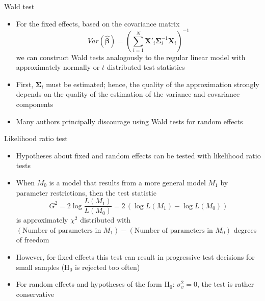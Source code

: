 \documentclass[aspectratio=169]{beamer}
\newcommand{\mat}[1]{\mathbf{#1}}
\newcommand{\gvect}[1]{\boldsymbol{#1}}
\newcommand{\gmat}[1]{\boldsymbol{#1}}
\begin{document}
\begin{frame}{Wald test}
  \begin{itemize}
    \item For the fixed effects, based on the covariance matrix
\[
  Var(\gvect{\hat\beta}) = \left( \sum_{i = 1}^N
    \mat{X}'_i \gmat{\Sigma}_i^{-1} \mat{X}_i \right)^{-1}
\]
we can construct Wald tests analogously to the regular linear model with
  approximately normally or $t$ distributed test statistics

    \item First, $\gmat{\Sigma}_i$ must be estimated; hence, the quality of the
      approximation strongly depends on the quality of the estimation of the
      variance and covariance components

    \item Many authors principally discourage using Wald tests for random
      effects \citep[e.\,g.,][p.~52 or \texttt{?lme4::pvalues}]{Hedeker2006}
  \end{itemize}
\end{frame}


\begin{frame}{Likelihood ratio test}
  \begin{itemize}
    \item Hypotheses about fixed and random effects can be tested with
      likelihood ratio tests
    \item When $M_0$ is a model that results from a more general model $M_1$ by
      parameter restrictions, then the test statistic
\[
  G^2 = 2\log \frac{L(M_1)}{L(M_0)}
      = 2\,(\log L(M_1) - \log L(M_0))
\]
  is approximately $\chi^2$ distributed with $(\text{Number of parameters
  in } M_1) - (\text{Number of parameters in } M_0)$ degrees of
  freedom
    \item However, for fixed effects this test can result in progressive test
      decisions for small samples (H$_0$ is rejected too often)
    \item For random effects and hypotheses of the form H$_0$:
      $\sigma^2_\upsilon = 0$, the test is rather conservative
  \end{itemize}
  \nocite{BrykRaudenbush2002}
\end{frame}
 
\end{document}
